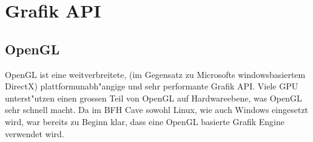 \section{Grafik API}
\subsection{OpenGL}
OpenGL ist eine weitverbreitete, (im Gegensatz zu Microsofts windowsbasiertem DirectX) plattformunabh"angige und sehr performante Grafik API. Viele GPU unterst"utzen einen grossen Teil von OpenGL auf Hardwareebene, was OpenGL sehr schnell macht. Da im BFH Cave sowohl Linux, wie auch Windows eingesetzt wird, war bereits zu Beginn klar, dass eine OpenGL basierte Grafik Engine verwendet wird.